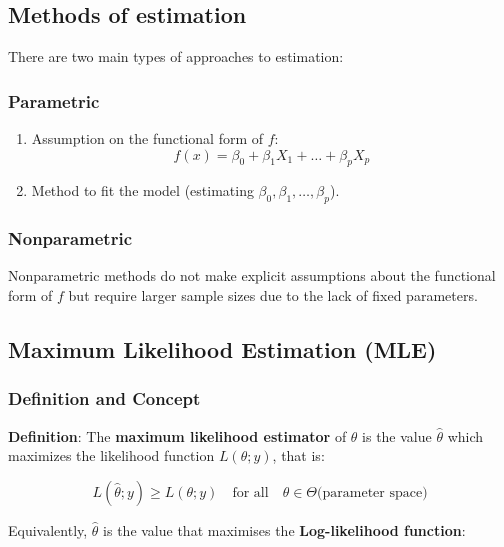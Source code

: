 \documentclass[11pt]{article}
\begin{document}
\subsection{Methods of estimation}

There are two main types of approaches to estimation:

\subsubsection{Parametric}

\begin{enumerate}
    \item Assumption on the functional form of \( f \):
    \begin{equation}
        f(x) = \beta_0 + \beta_1 X_1 + \ldots + \beta_p X_p
    \end{equation}
    \item Method to fit the model (estimating \( \beta_0, \beta_1, \ldots, \beta_p \)).
\end{enumerate}

\subsubsection{Nonparametric}

Nonparametric methods do not make explicit assumptions about the functional form of \( f \) but require larger sample sizes due to the lack of fixed parameters.

\subsection{Maximum Likelihood Estimation (MLE)}

\subsubsection{Definition and Concept}

\textbf{Definition}: The \textbf{maximum likelihood estimator} of $\theta$ is the value \( \hat{\theta} \) which maximizes the likelihood function \( L(\theta; y) \), that is:

\begin{equation}
    L(\hat{\theta}; y) \geq L(\theta; y) \quad \text{for all} \quad \theta \in \Theta \text{(parameter space)}
\end{equation}

Equivalently, $\hat{\theta}$ is the value that maximises the \textbf{Log-likelihood function}:
\end{document}
